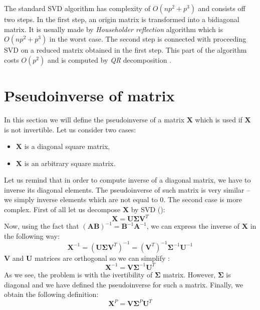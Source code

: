 \begin{appendices}
The standard SVD algorithm has complexity of $O(np^2+p^3)$ and consists off two steps. In the first step, an origin matrix is transformed into a bidiagonal matrix. It is usually made by \textit{Householder reflection} algorithm which is $O(np^2+p^3)$ in the worst case. The second step is connected with proceeding SVD on a reduced matrix obtained in the first step. This part of the algorithm costs $O(p^2)$ and is computed by \textit{QR} decomposition \citep{Banerjee}. 

\newpage
\section{Pseudoinverse of matrix}\label{app:pseudo}

In this section we will define the pseudoinverse of a matrix $\boldsymbol{X}$ which is used if $\boldsymbol{X}$ is not invertible. Let us consider two cases: 
\begin{itemize}
    \item $\boldsymbol{X}$ is a diagonal square matrix,
    \item $\boldsymbol{X}$ is an arbitrary square matrix.
\end{itemize}
Let us remind that in order to compute inverse of a diagonal matrix, we have to inverse its diagonal elements. The pseudoinverse of such matrix is very similar -- we simply inverse elements which are not equal to $0$. The second case is more complex. First of all let us decompose $\boldsymbol{X}$ by SVD ():
\begin{equation}
    \boldsymbol{X}=\boldsymbol{U}\boldsymbol{\Sigma}{\boldsymbol{V}^T}
\end{equation}
Now, using the fact that $(\boldsymbol{A}\boldsymbol{B})^{-1}=\boldsymbol{B}^{-1}\boldsymbol{A}^{-1}$, we can express the inverse of $\boldsymbol{X}$ in the following way:
\begin{equation}\label{eq:invert}
    \boldsymbol{X}^{-1}=(\boldsymbol{U}\boldsymbol{\Sigma}{\boldsymbol{V}^T})^{-1}=(\boldsymbol{V}^T)^{-1}{\boldsymbol{\Sigma}}^{-1}\boldsymbol{U}^{-1}
\end{equation}
$\boldsymbol{V}$ and $\boldsymbol{U}$ matrices are orthogonal so we can simplify :
\begin{equation}
    \boldsymbol{X}^{-1}=\boldsymbol{V}{\boldsymbol{\Sigma}}^{-1}\boldsymbol{U}^T
\end{equation}
As we see, the problem is with the ivertibility of $\boldsymbol{\Sigma}$ matrix. However, $\boldsymbol{\Sigma}$ is diagonal and we have defined the pseudoinverse for such a matrix. Finally, we obtain the following definition:
\begin{equation}
    \boldsymbol{X}^P=\boldsymbol{V}\boldsymbol{\Sigma}^{P}{\boldsymbol{U}^T}
\end{equation}


\end{appendices}
